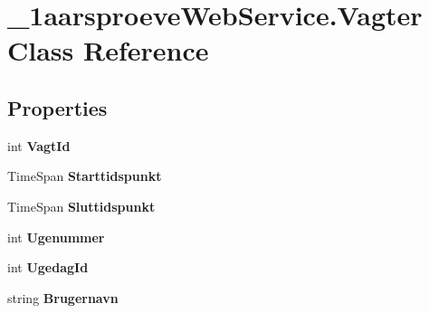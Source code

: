 \hypertarget{class__1aarsproeve_web_service_1_1_vagter}{}\section{\+\_\+1aarsproeve\+Web\+Service.\+Vagter Class Reference}
\label{class__1aarsproeve_web_service_1_1_vagter}
\subsection*{Properties}
\begin{DoxyCompactItemize}
\item 
\hypertarget{class__1aarsproeve_web_service_1_1_vagter_a15df5fb32bb67add824ffeffe1f0d331}{}int {\bfseries Vagt\+Id}\label{class__1aarsproeve_web_service_1_1_vagter_a15df5fb32bb67add824ffeffe1f0d331}

\item 
\hypertarget{class__1aarsproeve_web_service_1_1_vagter_a5be0ed1cd0cfcc0baddf1c19c18ad663}{}Time\+Span {\bfseries Starttidspunkt}\label{class__1aarsproeve_web_service_1_1_vagter_a5be0ed1cd0cfcc0baddf1c19c18ad663}

\item 
\hypertarget{class__1aarsproeve_web_service_1_1_vagter_ac8aa0b415b6c807ceefab8d4856e7839}{}Time\+Span {\bfseries Sluttidspunkt}\label{class__1aarsproeve_web_service_1_1_vagter_ac8aa0b415b6c807ceefab8d4856e7839}

\item 
\hypertarget{class__1aarsproeve_web_service_1_1_vagter_a1d2582404d77a871b2ee3f1c39df3c54}{}int {\bfseries Ugenummer}\label{class__1aarsproeve_web_service_1_1_vagter_a1d2582404d77a871b2ee3f1c39df3c54}

\item 
\hypertarget{class__1aarsproeve_web_service_1_1_vagter_a76ffed1966f107a9d83c25bc12688028}{}int {\bfseries Ugedag\+Id}\label{class__1aarsproeve_web_service_1_1_vagter_a76ffed1966f107a9d83c25bc12688028}

\item 
\hypertarget{class__1aarsproeve_web_service_1_1_vagter_a9912a77d44787c8d5c8d945d13db2699}{}string {\bfseries Brugernavn}\label{class__1aarsproeve_web_service_1_1_vagter_a9912a77d44787c8d5c8d945d13db2699}


\end{DoxyCompactItemize}
